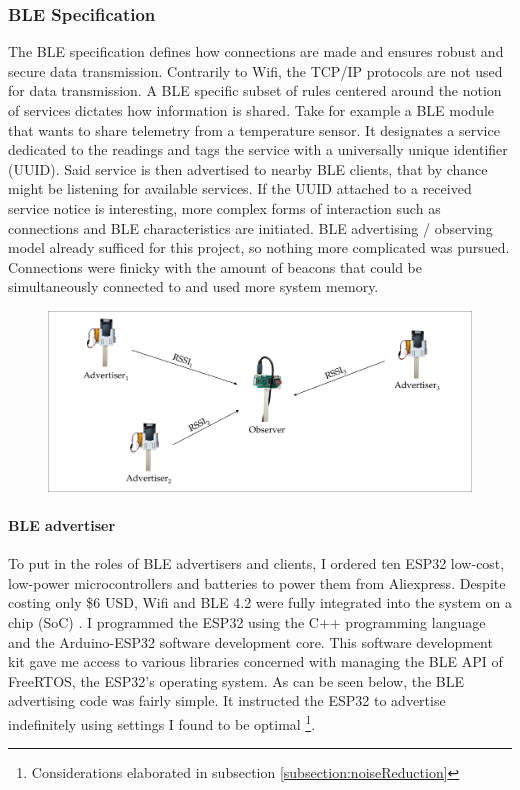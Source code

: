 \documentclass[a4paper, oneside]{ipsreport}
\begin{document}
\subsubsection{BLE Specification}
The BLE specification defines how connections are made and ensures robust and secure data transmission. Contrarily to Wifi, the TCP/IP protocols are not used for data transmission. A BLE specific subset of rules centered around the notion of services dictates how information is shared. Take for example a BLE module that wants to share telemetry from a temperature sensor. It designates a service dedicated to the readings and tags the service with a universally unique identifier (UUID). Said service is then advertised to nearby BLE clients, that by chance might be listening for available services. If the UUID attached to a received service notice is interesting, more complex forms of interaction such as connections and BLE characteristics are initiated. BLE advertising / observing model already sufficed for this project, so nothing more complicated was pursued. Connections were finicky with the amount of beacons that could be simultaneously connected to and used more system memory.

\begin{figure}[h]
	\centering
	\includegraphics[width=\linewidth]{./figures/ble-advertiser-observer.pdf}
	\label{fig:ble-advertiser-observer}
\end{figure}

\paragraph{BLE advertiser}
To put in the roles of BLE advertisers and clients, I ordered ten ESP32 low-cost, low-power microcontrollers and batteries to power them from Aliexpress. Despite costing only \$6 USD, Wifi and BLE 4.2 were fully integrated into the system on a chip (SoC) \cite{TtgoTdisplay}. I programmed the ESP32 using the C++ programming language and the Arduino-ESP32 software development core. This software development kit gave me access to various libraries concerned with managing the BLE API of FreeRTOS, the ESP32's operating system. As can be seen below, the BLE advertising code was fairly simple. It instructed the ESP32 to advertise indefinitely using settings I found to be optimal \footnote{Considerations elaborated in subsection \ref{subsection:noiseReduction}}.
\end{document}
